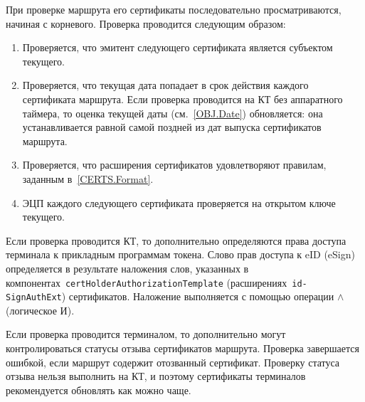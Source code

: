 При проверке маршрута его сертификаты последовательно просматриваются, начиная 
с корневого. Проверка проводится следующим образом:
\begin{enumerate}
\item
Проверяется, что эмитент следующего сертификата является субъектом текущего.

\item
Проверяется, что текущая дата попадает в срок действия каждого сертификата маршрута. 
Если проверка проводится на КТ без аппаратного таймера, то оценка текущей даты 
(см.~\ref{OBJ.Date}) обновляется: она устанавливается равной самой поздней из дат 
выпуска сертификатов маршрута.

\item
Проверяется, что расширения сертификатов удовлетворяют правилам,
заданным в~\ref{CERTS.Format}.

\item
ЭЦП каждого следующего сертификата проверяется на открытом ключе текущего.
\end{enumerate}

Если проверка проводится КТ, то дополнительно определяются права доступа
терминала к прикладным программам токена. Слово прав доступа к eID (eSign) 
определяется в результате наложения слов, указанных в
компонентах~\texttt{certHolderAuthorizationTemplate} 
(расширениях~\texttt{id-SignAuthExt}) сертификатов.
%
Наложение выполняется с помощью операции $\wedge$ (логическое И). 

Если проверка проводится терминалом, то дополнительно могут контролироваться
статусы отзыва сертификатов маршрута. Проверка завершается ошибкой, если 
маршрут содержит отозванный сертификат. 
%
Проверку статуса отзыва нельзя выполнить на КТ, и поэтому сертификаты 
терминалов рекомендуется обновлять как можно чаще.


